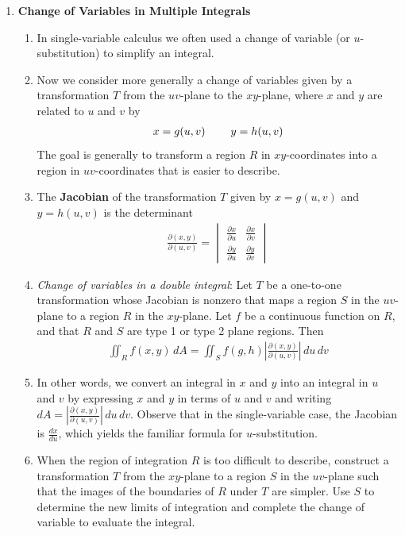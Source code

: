 \documentclass[10pt]{article}
\begin{document}
\begin{multicols}{2}
\begin{enumerate}
    \item \textbf{Change of Variables in Multiple Integrals}
    \begin{enumerate}
        \item In single-variable calculus we often used a change of variable (or $u$-substitution) to simplify an integral. 
        \item Now we consider more generally a change of variables given by a transformation $T$ from the $uv$-plane to the $xy$-plane, where $x$ and $y$ are related to $u$ and $v$ by
        \begin{align*}
            x = g(u,v) \hspace{8mm} y = h(u,v)
        \end{align*}
        The goal is generally to transform a region $R$ in $xy$-coordinates into a region in $uv$-coordinates that is easier to describe.
        \item The \textbf{Jacobian} of the transformation $T$ given by $x=g(u,v)$ and $y=h(u,v)$ is the determinant
        \begin{align*}
            \frac{\partial (x,y)}{\partial (u,v)}  =
            \begin{vmatrix}
                \frac{\partial x}{\partial u} & \frac{\partial x}{\partial v} \\[8pt]
                \frac{\partial y}{\partial u} & \frac{\partial y}{\partial v}
            \end{vmatrix}
        \end{align*}
        \item \textit{Change of variables in a double integral}: Let $T$ be a one-to-one transformation whose Jacobian is nonzero that maps a region $S$ in the $uv$-plane to a region $R$ in the $xy$-plane. Let $f$ be a continuous function on $R$, and that $R$ and $S$ are type 1 or type 2 plane regions. Then
        \begin{align*}
            \iint_R f(x,y) \,dA = \iint_S f(g, h) \left| \frac{\partial (x,y)}{\partial (u,v)} \right| \,du \,dv
        \end{align*}
        \item In other words, we convert an integral in $x$ and $y$ into an integral in $u$ and $v$ by expressing $x$ and $y$ in terms of $u$ and $v$ and writing $dA = \left| \frac{\partial (x,y)}{\partial (u,v)} \right| \,du \,dv$. Observe that in the single-variable case, the Jacobian is $\frac{dx}{du}$, which yields the familiar formula for $u$-substitution. 
        \item When the region of integration $R$ is too difficult to describe, construct a transformation $T$ from the $xy$-plane to a region $S$ in the $uv$-plane such that the images of the boundaries of $R$ under $T$ are simpler. Use $S$ to determine the new limits of integration and complete the change of variable to evaluate the integral.

\end{enumerate}
\end{enumerate}
\end{multicols}
\end{document}
